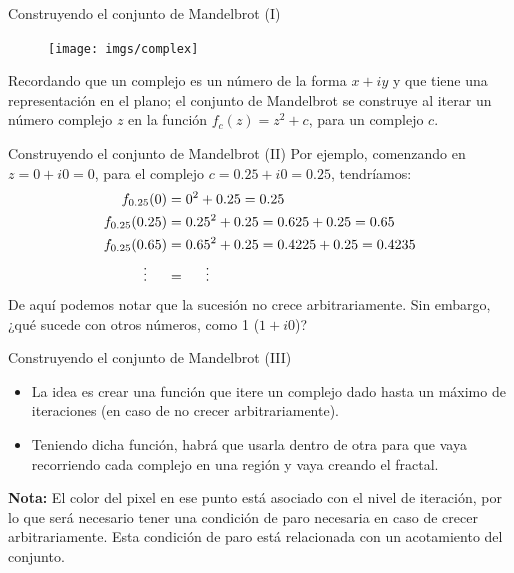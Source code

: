 \documentclass[usenames,dvipsnames]{beamer}
\begin{document}
  \begin{frame}{Construyendo el conjunto de Mandelbrot (I)}
    \begin{figure}
      \begin{center}
        \vspace*{-1.5cm}
        \texttt{[image: imgs/complex]}
      \end{center}
    \end{figure}
    Recordando que un complejo es un número de la forma $x+iy$ y que tiene una
    representación en el plano; el conjunto de Mandelbrot se construye al iterar
    un número complejo $z$ en la función $f_c(z) = z^2 + c$, para un complejo $c$.
  \end{frame}

  \begin{frame}{Construyendo el conjunto de Mandelbrot (II)}
    Por ejemplo, comenzando en $z = 0 + i0 = 0$, para el complejo
    $c = 0.25 + i0 = 0.25$, tendríamos:
    \begin{align*}
    f_{0.25}(0) &=  0^2 + 0.25 = 0.25\\
    f_{0.25}(0.25) &=  0.25^2 + 0.25 = 0.625 + 0.25 = 0.65\\
    f_{0.25}(0.65) &=  0.65^2 + 0.25 = 0.4225 + 0.25 = 0.4235\\
    \vdots\hspace*{0.5cm} &= \hspace*{0.5cm}\vdots
    \end{align*}
    De aquí podemos notar que la sucesión no crece arbitrariamente.
    Sin embargo, ¿qué sucede con otros números, como 1 ($1 + i0$)?
  \end{frame}

  \begin{frame}{Construyendo el conjunto de Mandelbrot (III)}
    \begin{itemize}
      \item La idea es crear una función que itere un complejo dado hasta
      un máximo de iteraciones (en caso de no crecer arbitrariamente).\\
      \item Teniendo dicha función, habrá que usarla dentro de otra para que
      vaya recorriendo cada complejo en una región y vaya creando el fractal.\\
    \end{itemize}
    \textbf{Nota:} El color del pixel en ese punto está asociado con el nivel
    de iteración, por lo que será necesario tener una condición de paro
    necesaria en caso de crecer arbitrariamente. Esta condición de paro está
    relacionada con un acotamiento del conjunto.
  \end{frame}
\end{document}
